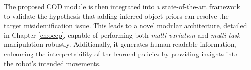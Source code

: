 The proposed COD module is then integrated into a state-of-the-art framework to validate the hypothesis that adding inferred object priors can resolve the target misidentification issue. This leads to a novel modular architecture, detailed in Chapter \ref{ch:occp}, capable of performing both \textit{multi-variation} and \textit{multi-task} manipulation robustly. Additionally, it generates human-readable information, enhancing the interpretability of the learned policies by providing insights into the robot's intended movements.

